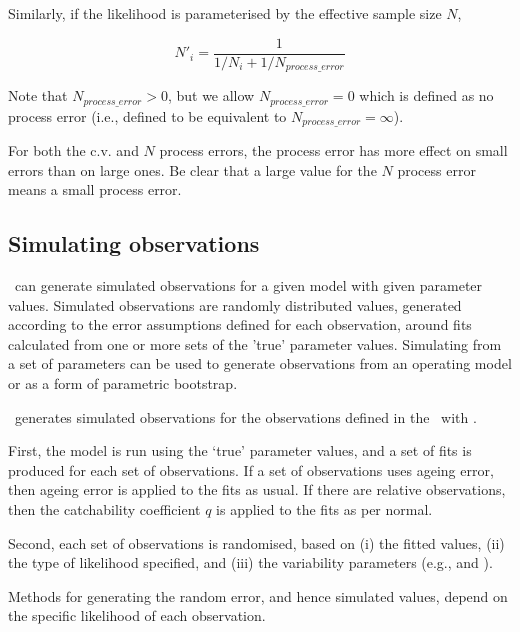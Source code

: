Similarly, if the likelihood is parameterised by the effective sample size $N$,

\begin{equation}
 N'_i  = \frac{1}{1 / {N_i}+ 1 / N_{process\_error}}
\end{equation}

Note that $N_{process\_ error} > 0$, but we allow $N_{process\_ error}=0$ which is defined as no process error (i.e., defined to be equivalent to $N_{process\_ error}=\infty$). 

For both the c.v. and $N$ process errors, the process error has more effect on small errors than on large ones. Be clear that a large value for the $N$ process error means a small process error.

\subsection{Simulating observations}

\SPM\ can generate simulated observations for a given model with given parameter values. Simulated observations are randomly distributed values, generated according to the error assumptions defined for each observation, around fits calculated from one or more sets of the 'true' parameter values. Simulating from a set of parameters can be used to generate observations from an operating model or as a form of parametric bootstrap. 

\SPM\ generates simulated observations for the observations defined in the \config\ with . 

First, the model is run using the `true' parameter values, and a set of fits is produced for each set of observations. If a set of observations uses ageing error, then ageing error is applied to the fits as usual. If there are relative observations, then the catchability coefficient $q$ is applied to the fits as per normal. 

Second, each set of observations is randomised, based on (i) the fitted values, (ii) the type of likelihood specified, and (iii) the variability parameters (e.g.,  and ). 

Methods for generating the random error, and hence simulated values, depend on the specific likelihood of each observation. 

